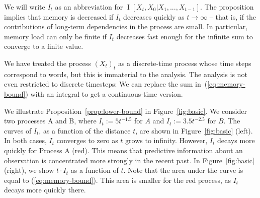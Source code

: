 \documentclass[11pt,letterpaper]{article}
\begin{document}
We will write $I_t$ as an abbreviation for $\operatorname{I}[X_t, X_0 | X_1, ..., X_{t-1}]$.
The proposition implies that memory is decreased if $I_t$ decreases quickly as $t \rightarrow \infty$ -- that is, if the contributions of long-term dependencies in the process are small.
In particular, memory load can only be finite if $I_t$ decreases fast enough for the infinite sum to converge to a finite value.

We have treated the process $(X_t)_t$ as a discrete-time process whose time steps correspond to words, but this is immaterial to the analysis.
The analysis is not even restricted to discrete timesteps: We can replace the sum in~(\ref{eq:memory-bound}) with an integral to get a continuous-time version.



We illustrate Proposition~\ref{prop:lower-bound} in Figure~\ref{fig:basic}.
We consider two processes A and B, where $I_t := 5t^{-1.5}$ for $A$ and $I_t := 3.5 t^{-2.5}$ for $B$.
The curves of $I_t$, as a function of the distance $t$, are shown in Figure~\ref{fig:basic} (left).
In both cases, $I_t$ converges to zero as $t$ grows to infinity. 
However, $I_t$ decays more quickly for Process A (red).
This means that predictive information about an observation is concentrated more strongly in the recent past.
In Figure~\ref{fig:basic} (right), we show $t\cdot I_t$ as a function of $t$.
Note that the area under the curve is equal to (\ref{eq:memory-bound}).
This area is smaller for the red process, as $I_t$ decays more quickly there.  
\end{document}
